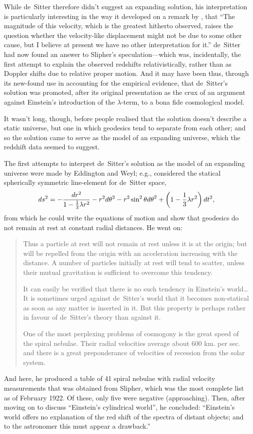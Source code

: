 \documentclass[12 pt]{article}
\begin{document}
While de~Sitter therefore didn't suggest an expanding solution, his interpretation is particularly interesting in the way it developed on a remark by \citet{Slipher1913}, that ``The magnitude of this velocity, which is the greatest hitherto observed, raises the question whether the velocity-like displacement might not be due to some other cause, but I believe at present we have no other interpretation for it.'' de~Sitter had now found an answer to Slipher's speculation---which was, incidentally, the first attempt to explain the observed redshifts relativistically, rather than as Doppler shifts due to relative proper motion. And it may have been thus, through its new-found use in accounting for the empirical evidence, that de~Sitter's solution was promoted, after its original presentation as the crux of an argument against Einstein's introduction of the $\lambda$-term, to a bona fide cosmological model. 

It wasn't long, though, before people realised that the solution doesn't describe a static universe, but one in which geodesics tend to separate from each other; and so the solution came to serve as the model of an expanding universe, which the redshift data seemed to suggest. 

The first attempts to interpret de~Sitter's solution as the model of an expanding universe were made by Eddington and Weyl; e.g., \citet{Eddington1923} considered the statical spherically symmetric line-element for de~Sitter space,
\begin{equation}
ds^2=-\frac{dr^2}{1-{1\over 3}\lambda{r^2}}-r^2d\theta^2-r^2\sin^2\theta{d\theta}^2+\left(1-{1\over 3}\lambda{r^2}\right)dt^2,
\end{equation}
from which he could write the equations of motion and show that geodesics do not remain at rest at constant radial distances. He went on: 
\begin{quotation}
Thus a particle at rest will not remain at rest unless it is at the origin; but will be repelled from the origin with an acceleration increasing with the distance. A number of particles initially at rest will tend to scatter, unless their mutual gravitation is sufficient to overcome this tendency.

It can easily be verified that there is no such tendency in Einstein's world\ldots It is sometimes urged against de~Sitter's world that it becomes non-statical as soon as any matter is inserted in it. But this property is perhaps rather in favour of de~Sitter's theory than against it.

One of the most perplexing problems of cosmogony is the great speed of the spiral nebulae. Their radial velocities average about 600 km. per sec. and there is a great preponderance of velocities of recession from the solar system.
\end{quotation}
And here, he produced a table of 41 spiral nebulae with radial velocity measurements that was obtained from Slipher, which was the most complete list as of February 1922. Of these, only five were negative (approaching). Then, after moving on to discuss ``Einstein's cylindrical world'', he concluded: ``Einstein's world offers no explanation of the red shift of the spectra of distant objects; and to the astronomer this must appear a drawback.'' 
\end{document}

